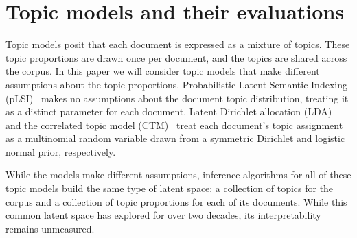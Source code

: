 \section{Topic models and their evaluations}
\label{sec:models}




Topic models posit that each document is expressed as a mixture of
topics.  These topic proportions are drawn once per document, and the
topics are shared across the corpus.  In this paper we will consider
topic models that make different assumptions about the topic
proportions.  Probabilistic Latent Semantic Indexing
(pLSI)~\cite{hofmann-99} makes no assumptions about the document topic
distribution, treating it as a distinct parameter for each document.
Latent Dirichlet allocation (LDA)~\cite{blei-03} and the correlated
topic model (CTM)~\cite{blei-06} treat each document's topic
assignment as a multinomial random variable drawn from a symmetric
Dirichlet and logistic normal prior, respectively.

While the models make different assumptions, inference algorithms for all of
these topic models build the same type of latent space: a collection of topics
for the corpus and a collection of topic proportions for each of its
documents.  While this common latent space has explored for over two decades,
its interpretability remains unmeasured.

